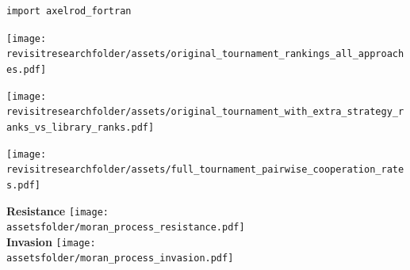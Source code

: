 \documentclass{beamer}
\newcommand{\assetsfolder}{./assets}
\newcommand{\revisitresearchfolder}{$HOME/rsc/revisiting-axelrod-second}
\begin{document}
\begin{frame}[fragile]{}

    \begin{center}
        \begin{minipage}{0.8\textwidth}
            \begin{verbatim}
import axelrod_fortran
            \end{verbatim}
        \end{minipage}
    \end{center}
\end{frame}

    \begin{frame}
        \begin{center}
            \scalebox{.8}{
                
            }
        \end{center}
    \end{frame}

    \begin{frame}
        \begin{center}
            \texttt{[image: \\revisitresearchfolder/assets/original\_tournament\_rankings\_all\_approaches.pdf]}
        \end{center}
    \end{frame}

    \begin{frame}
        \begin{center}
            \texttt{[image: \\revisitresearchfolder/assets/original\_tournament\_with\_extra\_strategy\_ranks\_vs\_library\_ranks.pdf]}
        \end{center}
    \end{frame}

    \begin{frame}
        \begin{center}
            \texttt{[image: \\revisitresearchfolder/assets/full\_tournament\_pairwise\_cooperation\_rates.pdf]}
        \end{center}
    \end{frame}

    \begin{frame}
        \begin{center}
            \textbf{Resistance}
            \texttt{[image: \\assetsfolder/moran\_process\_resistance.pdf]}\\

            \textbf{Invasion}
            \texttt{[image: \\assetsfolder/moran\_process\_invasion.pdf]}
        \end{center}
    \end{frame}
\end{document}
